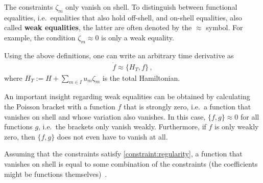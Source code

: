     \begin{notation}
        The constraints $\zeta_m$ only vanish on shell. To distinguish between functional equalities, i.e.~equalities that also hold off-shell, and on-shell equalities, also called \textbf{weak equalities}, the latter are often denoted by the $\approx$ symbol. For example, the condition $\zeta_m\approx0$ is only a weak equality.
    \end{notation}
    Using the above definitions, one can write an arbitrary time derivative as
    \begin{gather}
        \dot{f}\approx\{H_T,f\}\,,
    \end{gather}
    where $H_T := H + \sum_{m\in I}u_m\zeta_m$ is the total Hamiltonian.

    \begin{remark}[Closure]
        An important insight regarding weak equalities can be obtained by calculating the Poisson bracket with a function $f$ that is strongly zero, i.e.~a function that vanishes on shell and whose variation also vanishes. In this case, $\{f,g\}\approx0$ for all functions $g$, i.e.~the brackets only vanish weakly. Furthermore, if $f$ is only weakly zero, then $\{f,g\}$ does not even have to vanish at all.
    \end{remark}

    \begin{property}\label{constraint:weakly_vanishing_functions}
        Assuming that the constraints satisfy \cref{constraint:regularity}, a function that vanishes on shell is equal to some combination of the constraints (the coefficients might be functions themselves)~\citep[p.~70]{henneaux_quantization_1992}.
    \end{property}

